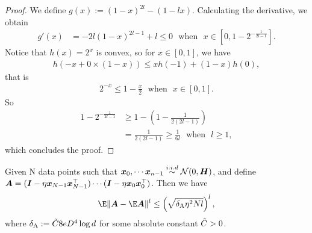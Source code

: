 \begin{proof}
    We define $g(x):=(1-x)^{2l}-(1-lx)$.
    Calculating the derivative, we obtain
    \begin{align*}
        g'(x)&=-2l(1-x)^{2l-1}+l \leq 0 ~~~\text{when} ~~~x\in[0, 1-2^{-\frac{1}{2l-1}}].
    \end{align*}
    Notice that $h(x) = 2^x$ is convex, so for $x\in[0, 1]$, we have
    \begin{align*}
        h(-x+0\times(1-x))\leq xh(-1)+(1-x)h(0),
    \end{align*}
    that is 
    \begin{align*}
        2^{-x}\leq 1-\frac{x}{2}~~~\text{when} ~~~x\in[0, 1]. 
    \end{align*}
    So 
    \begin{align*}
        1-2^{-\frac{1}{2l-1}}&\geq1-\left(1-\frac{1}{2(2l-1)}\right) \\
        &=\frac{1}{2(2l-1)}\geq\frac{1}{6l}~~~\text{when} ~~~l\geq 1,
    \end{align*}
    which concludes the proof.
\end{proof}
\begin{lemma} \label{lem:un-shuffle-A-EA-expectation}
    Given N data points such that ${\bm{x}}_0, \cdots {\bm{x}}_{n-1} \overset{i.i.d}{\sim} \mathcal{N}(0, {\bm{H}})$, and define ${\bm{A}} = ({\bm{I}}-\eta {\bm{x}}_{N-1}{\bm{x}}_{N-1}^{\top})\cdots({\bm{I}}-\eta {\bm{x}}_0{\bm{x}}_0^{\top})$. Then we have
    \[\E\|\mA-\E\mA\|^l \leq \left(\sqrt{\deltaA\eta^2Nl}\right)^l,\]
    where $\delta_{\mathrm{A}}:= \Tilde{C}8eD^4\log d$ for some absolute constant $\Tilde{C} > 0$.
\end{lemma}
